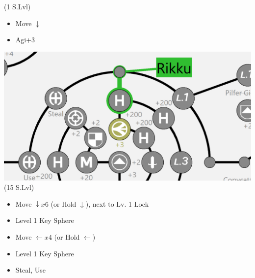 \begin{spheregrid}
    \begin{multicols}{2}
        \begin{itemize}
            \rikkuf (1 S.Lvl)
            \begin{itemize}
                \item Move $\downarrow$
                \item Agi+3
            \end{itemize}
            \includegraphics[width=.5\columnwidth]{graphics/macalaniarikku}
            \kimahrif (15 S.Lvl)
            \begin{itemize}
                \item Move $\downarrow x6$ (or Hold $\downarrow$), next to Lv. 1 Lock
                \item Level 1 Key Sphere
                \item Move $\leftarrow x4$ (or Hold $\leftarrow$)
                \item Level 1 Key Sphere
                \columnbreak
                \item Steal, Use
\end{itemize}
\end{itemize}
\end{multicols}
\end{spheregrid}
